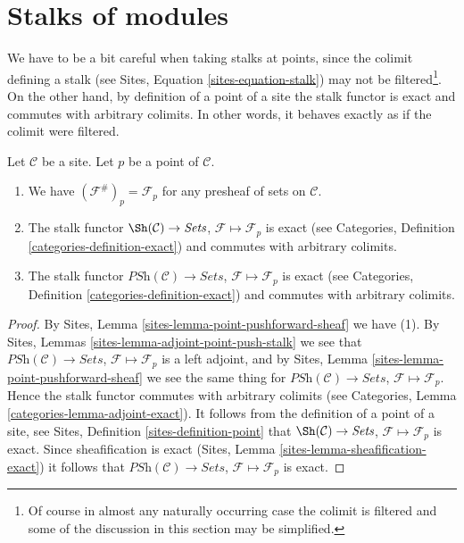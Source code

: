 \section{Stalks of modules}
\label{section-stalks}

\noindent
We have to be a bit careful when taking stalks at points,
since the colimit defining a stalk (see
Sites, Equation \ref{sites-equation-stalk})
may not be filtered\footnote{Of course in almost any naturally occurring
case the colimit is filtered and some of the discussion in this section
may be simplified.}. On the other hand, by definition of a point of a site
the stalk functor is exact and commutes with arbitrary colimits.
In other words, it behaves exactly as if the colimit were filtered.

\begin{lemma}
\label{lemma-stalk-exact}
Let $\mathcal{C}$ be a site.
Let $p$ be a point of $\mathcal{C}$.
\begin{enumerate}
\item We have $(\mathcal{F}^\#)_p = \mathcal{F}_p$
for any presheaf of sets on $\mathcal{C}$.
\item The stalk functor
$\Sh(\mathcal{C}) \to \textit{Sets}$,
$\mathcal{F} \mapsto \mathcal{F}_p$ is exact (see
Categories, Definition \ref{categories-definition-exact})
and commutes with arbitrary colimits.
\item The stalk functor
$\textit{PSh}(\mathcal{C}) \to \textit{Sets}$,
$\mathcal{F} \mapsto \mathcal{F}_p$ is exact (see
Categories, Definition \ref{categories-definition-exact})
and commutes with arbitrary colimits.
\end{enumerate}
\end{lemma}

\begin{proof}
By
Sites, Lemma \ref{sites-lemma-point-pushforward-sheaf}
we have (1).
By
Sites, Lemmas \ref{sites-lemma-adjoint-point-push-stalk}
we see that
$\textit{PSh}(\mathcal{C}) \to \textit{Sets}$,
$\mathcal{F} \mapsto \mathcal{F}_p$ is a left adjoint,
and by
Sites, Lemma \ref{sites-lemma-point-pushforward-sheaf}
we see the same thing for
$\textit{PSh}(\mathcal{C}) \to \textit{Sets}$,
$\mathcal{F} \mapsto \mathcal{F}_p$.
Hence the stalk functor commutes with arbitrary colimits (see
Categories, Lemma \ref{categories-lemma-adjoint-exact}).
It follows from the definition of a point of a site, see
Sites, Definition \ref{sites-definition-point}
that $\Sh(\mathcal{C}) \to \textit{Sets}$,
$\mathcal{F} \mapsto \mathcal{F}_p$
is exact. Since sheafification is exact
(Sites, Lemma \ref{sites-lemma-sheafification-exact})
it follows that $\textit{PSh}(\mathcal{C}) \to \textit{Sets}$,
$\mathcal{F} \mapsto \mathcal{F}_p$
is exact.
\end{proof}


